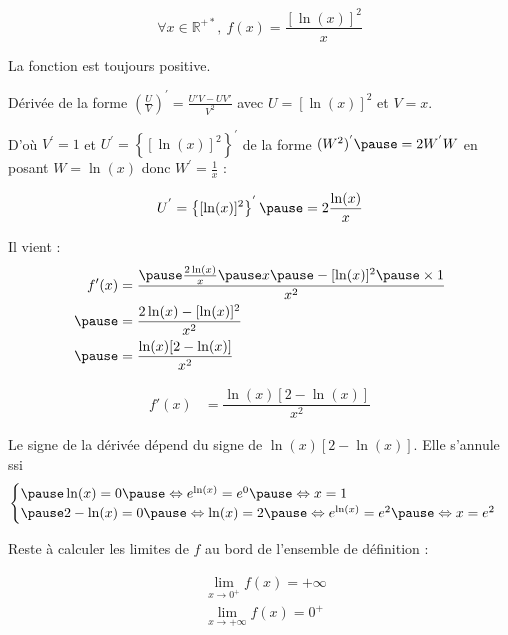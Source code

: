 \documentclass[9pt,handout,professionalfonts,hyperref]{beamer}
\begin{document}
\begin{frame}
$$
\forall x \in \mathbb{R}^{+*}, ~f(x)=\dfrac{[\ln(x)]^2}{x}
$$

\pause La fonction est toujours positive. \newline

\pause Dérivée de la forme $(\frac{U}{V})^{'}=\frac{U'V-UV'}{V^2}$ \pause avec $U=[\ln(x)]^2$ et $V=x$.\newline

\pause D'où $V^{'} = 1$ \pause et $U^{'} = \left\{[\ln(x)]^2\right\}^{'}$ \pause de la forme $(W^2)^{'} \pause = 2W^{'}W$ \pause en posant $W=\ln(x)$ \pause donc $W^{'}=\frac{1}{x}$ :

\pause $$U^{'} = \left\{[\ln(x)]^2\right\}^{'} \pause = 2 \frac{\ln(x)}{x}$$

\pause
Il vient :
\[\begin{aligned}
f'(x)
&=\dfrac{\pause \frac{2\ln(x)}{x}\pause x \pause - [\ln(x)]^2 \pause \times 1}{x^2}\\
\pause &=\dfrac{2 \ln(x) -[\ln(x)]^2}{x^2} \\
\pause &=\dfrac{\ln(x) [2-\ln(x)]}{x^2}
\end{aligned}\]

\end{frame}

\begin{frame}

\[\begin{aligned}
f'(x)&=\dfrac{\ln(x) [2-\ln(x)]}{x^2}
\end{aligned}\]

\pause Le signe de la dérivée dépend du signe de $\ln(x) [2-\ln(x)]$. \pause Elle s'annule ssi
$$\begin{cases}
\pause \ln(x) =0 \pause \Leftrightarrow e^{\ln(x)} = e^0 \pause \Leftrightarrow  x=1 \\
\pause 2-\ln(x)=0 \pause \Leftrightarrow \ln(x)=2 \pause \Leftrightarrow e^{\ln(x)} = e^2 \pause \Leftrightarrow x=e^2
\end{cases}$$

\medskip

Reste à calculer les limites de $f$ au bord de l'ensemble de définition :

\[\begin{aligned}
&\lim_{x \to 0^+} f(x)= +\infty \\
&\lim_{x \to +\infty} f(x)=0^+
\end{aligned}\]\\

\end{frame}
\end{document}
